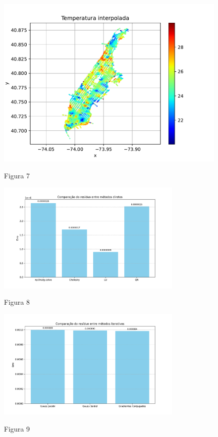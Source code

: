 \documentclass{article}
\begin{document}
    \begin{figure}[ht]
        \centering
        \includegraphics[width=1\textwidth, trim={5px 10px 65px 25px},clip]{../figs/fig7.pdf}
        
        \LARGE{Figura 7}
    \end{figure}

    \newpage

    \begin{figure}[ht]
        \centering
        \includegraphics[width=0.8\textwidth, trim={5px 10px 15px 25px},clip]{../figs/fig8.pdf}
        
        Figura 8
    \end{figure}

    \vspace{2cm}

    \begin{figure}[ht]
        \centering
        \includegraphics[width=0.8\textwidth, trim={5px 10px 15px 25px},clip]{../figs/fig9.pdf}
        
        Figura 9
    \end{figure}
\end{document}
